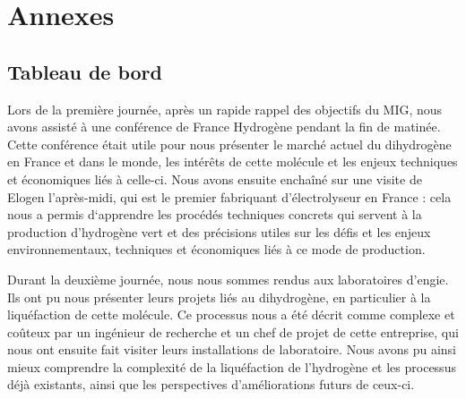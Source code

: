 \documentclass[11pt,french,a4paper]{article}
\makeatletter
\newcommand\backmatter{%
    \clearpage
   }
\makeatother
\begin{document}
\newpage

\backmatter

\section*{Annexes} 

\subsection*{Tableau de bord}
Lors de la première journée,  après un rapide rappel des objectifs du MIG, nous avons assisté à une conférence de France Hydrogène pendant la fin de matinée. Cette conférence était utile pour nous présenter le marché actuel du dihydrogène en France et dans le monde, les intérêts de cette molécule et les enjeux techniques et économiques liés à celle-ci. 
Nous avons ensuite enchaîné sur une visite de Elogen l’après-midi, qui est le premier fabriquant d’électrolyseur en France : cela nous a permis d‘apprendre les procédés techniques concrets qui servent à la production d’hydrogène vert et des précisions utiles sur les défis et les enjeux environnementaux, techniques et économiques liés à ce mode de production. 

Durant la deuxième journée, nous nous sommes rendus aux laboratoires d’engie. Ils ont pu nous présenter leurs projets liés au dihydrogène, en particulier à la liquéfaction de cette molécule. Ce processus nous a été décrit comme complexe et coûteux par un ingénieur de recherche et un chef de projet de cette entreprise, qui nous ont ensuite fait visiter leurs installations de laboratoire. Nous avons pu ainsi mieux comprendre la complexité de la liquéfaction de l’hydrogène et les processus déjà existants, ainsi que les perspectives d’améliorations futurs de ceux-ci.
\end{document}

